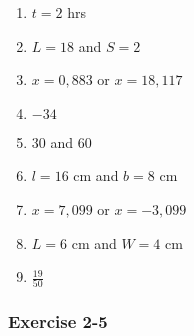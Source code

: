 {\begin{multicols}{3}
\begin{enumerate}[noitemsep, label=\textbf{\arabic*}. ] 
\item$t = 2$ hrs %
\item $L = 18$ and $S = 2$%
\item $x = 0,883$ or $x = 18,117$%
\item $-34$%
\item$30$ and $60$  %
\item $l=16$ cm and $b=8$ cm%
\item $x = 7,099$ or $x = -3,099$%
\item $L = 6$ cm and $W = 4$ cm %
\item$\frac{19}{50}$ %
       
\end{enumerate}

\subsubsection*{Exercise 2-5} %


\end{multicols}}
